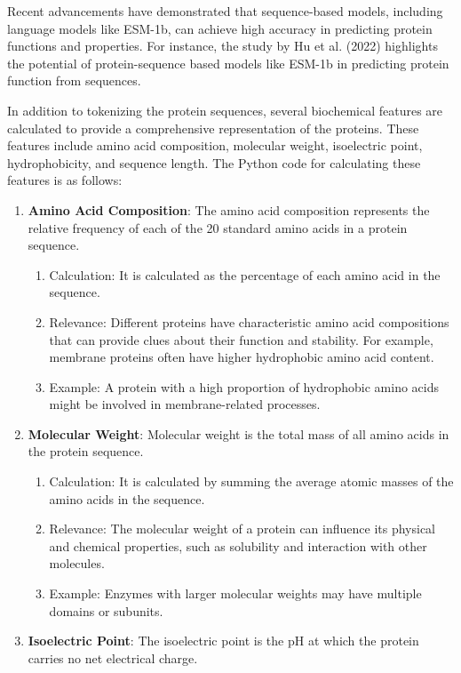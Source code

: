 Recent advancements have demonstrated that sequence-based models, including language models like ESM-1b, can achieve high accuracy in predicting protein functions and properties. For instance, the study by Hu et al. (2022) highlights the potential of protein-sequence based models like ESM-1b in predicting protein function from sequences. \autocite{huExploringEvolutionbasedFree2022}

In addition to tokenizing the protein sequences, several biochemical features are calculated to provide a comprehensive representation of the proteins. These features include amino acid composition, molecular weight, isoelectric point, hydrophobicity, and sequence length. The Python code for calculating these features is as follows:

\begin{enumerate}
    \item \textbf{Amino Acid Composition}: The amino acid composition represents the relative frequency of each of the 20 standard amino acids in a protein sequence.
    \begin{enumerate}
        \item Calculation: It is calculated as the percentage of each amino acid in the sequence.
        \item Relevance: Different proteins have characteristic amino acid compositions that can provide clues about their function and stability. For example, membrane proteins often have higher hydrophobic amino acid content.
        \item Example: A protein with a high proportion of hydrophobic amino acids might be involved in membrane-related processes.
    \end{enumerate}
    \item \textbf{Molecular Weight}: Molecular weight is the total mass of all amino acids in the protein sequence.
    \begin{enumerate}
        \item Calculation: It is calculated by summing the average atomic masses of the amino acids in the sequence.
        \item Relevance: The molecular weight of a protein can influence its physical and chemical properties, such as solubility and interaction with other molecules.
        \item Example: Enzymes with larger molecular weights may have multiple domains or subunits.
    \end{enumerate}
    \item \textbf{Isoelectric Point}: The isoelectric point is the pH at which the protein carries no net electrical charge.

\end{enumerate}
